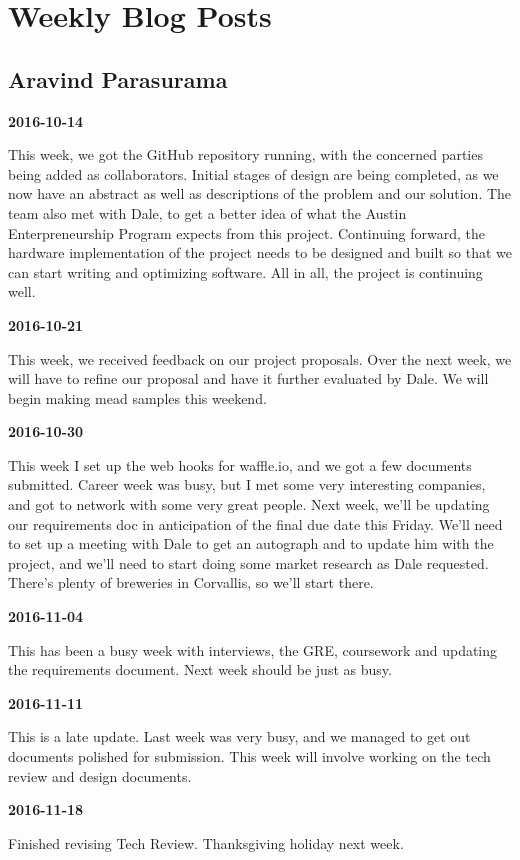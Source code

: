 \section{Weekly Blog Posts}
\subsection{Aravind Parasurama}

\textbf{2016-10-14}

This week, we got the GitHub repository running, with the concerned parties being added as collaborators. Initial stages of design are being completed, as we now have an abstract as well as descriptions of the problem and our solution. The team also met with Dale, to get a better idea of what the Austin Enterpreneurship Program expects from this project. Continuing forward, the hardware implementation of the project needs to be designed and built so that we can start writing and optimizing software. All in all, the project is continuing well.

\textbf{2016-10-21} 

This week, we received feedback on our project proposals. Over the next week, we will have to refine our proposal and have it further evaluated by Dale. We will begin making mead samples this weekend.

\textbf{2016-10-30} 

This week I set up the web hooks for waffle.io, and we got a few documents submitted. Career week was busy, but I met some very interesting companies, and got to network with some very great people. Next week, we'll be updating our requirements doc in anticipation of the final due date this Friday. We'll need to set up a meeting with Dale to get an autograph and to update him with the project, and we'll need to start doing some market research as Dale requested. There's plenty of breweries in Corvallis, so we'll start there. 

\textbf{2016-11-04} 

This has been a busy week with interviews, the GRE, coursework and updating the requirements document. Next week should be just as busy.

\textbf{2016-11-11} 

This is a late update. Last week was very busy, and we managed to get out documents polished for submission. This week will involve working on the tech review and design documents.

\textbf{2016-11-18} 

Finished revising Tech Review. Thanksgiving holiday next week.

